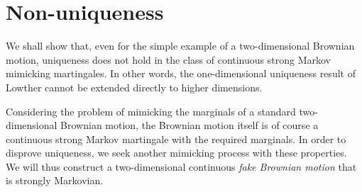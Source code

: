 \documentclass[12pt,oneside]{amsart}
\theoremstyle{definition}
\numberwithin{equation}{section}
\begin{document}
\section{Non-uniqueness}\label{sec:non-uniqueness}
We shall show that, even for the simple example of a two-dimensional Brownian motion, uniqueness does not hold in the class of continuous strong Markov mimicking martingales. In other words, the one-dimensional uniqueness result of Lowther \cite{Lo08b} cannot be extended directly to higher dimensions.

Considering the problem of mimicking the marginals of a standard two-dimensional Brownian motion, the Brownian motion itself is of course a continuous strong Markov martingale with the required marginals. In order to disprove uniqueness, we seek another mimicking process with these properties. We will thus construct a two-dimensional continuous \emph{fake Brownian motion} that is strongly Markovian.
\end{document}

